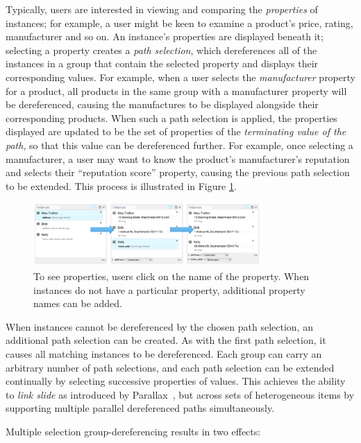 \documentclass{sigchi}
\begin{document}
Typically, users are interested in viewing and comparing the \emph{properties} of instances; for example, a user might be keen to examine a product's price, rating, manufacturer and so on.  An instance's properties are displayed beneath it; selecting a property creates a \emph{path selection}, which dereferences all of the instances in a group that contain the selected property and displays their corresponding values.  For example, when a user selects the \emph{manufacturer} property for a product, all products in the same group with a manufacturer property will be dereferenced, causing the manufactures to be displayed alongside their corresponding products.  When such a path selection is applied, the properties displayed are updated to be the set of properties of the \emph{terminating value of the path}, so that this value can be dereferenced further.  For example, once selecting a manufacturer, a user may want to know the product's manufacturer's reputation and selects their ``reputation score'' property, causing the previous path selection to be extended. This process is illustrated in Figure \ref{fig:multipathing}.

\begin{figure}[h]
\begin{center}
\includegraphics[width=8.7cm]{img/multipathing}
\caption{To see properties, users click on the name of the property. When instances do not have a particular property, additional property names can be added.}
\label{fig:multipathing}
\end{center}
\end{figure}

When instances cannot be dereferenced by the chosen path selection, an additional path selection can be created. As with the first path selection, it causes all matching instances to be dereferenced.  Each group can carry an arbitrary number of path selections, and each path selection can be extended continually by selecting successive properties of values. This achieves the ability to \emph{link slide} as introduced by Parallax~\cite{parallax}, but across sets of heterogeneous items by supporting multiple parallel dereferenced paths simultaneously.  

Multiple selection group-dereferencing results in two effects: 
\end{document}
